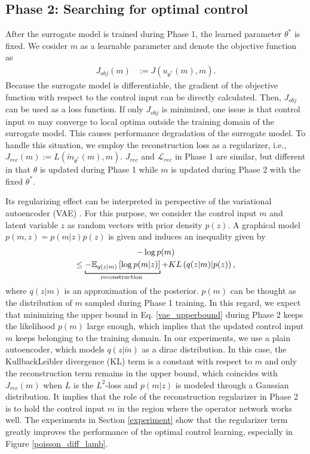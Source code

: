 \documentclass[letterpaper]{article}
\begin{document}
\subsection*{Phase 2: Searching for optimal control} \label{section3_2}
After the surrogate model is trained during Phase 1, the learned parameter $\theta^*$ is fixed. We cosider $m$ as a learnable parameter and denote the objective function as
\begin{align}
  J_{obj}(m) &:= J(u_{\theta^*}(m), m).
\end{align}
Because the surrogate model is differentiable, the gradient of the objective function with respect to the control input can be directly calculated. Then, $J_{obj}$ can be used as a loss function. If only $J_{obj}$ is minimized, one issue is that control input $m$ may converge to local optima outside the training domain of the surrogate model. This causes performance degradation of the surrogate model. To handle this situation, we employ the reconstruction loss as a regularizer, i.e., $J_{rec}(m) := L(\tilde{m}_{\theta^*} (m), m)$. $J_{rec}$ and $\mathcal{L}_{rec}$ in Phase 1 are similar, but different in that $\theta$ is updated during Phase 1 while $m$ is updated during Phase 2 with the fixed $\theta^*$.

Its regularizing effect can be interpreted in perspective of the variational autoencoder (VAE) \citep{kingma2013auto}. For this purpose, we consider the control input $m$ and latent variable $z$ as random vectors with prior density $p(z)$. A graphical model $p(m,z) = p(m|z)p(z)$ is given and induces an inequality given by
\begin{multline}\label{vae_upperbound}
  -\log p(m) \\
   \leq \underbracket[0.8pt]{-\mathbb{E}_{q(z|m)}\left[\log p(m| z) \right] }_\text{\clap{reconstruction~}} +KL\left(q(z|m) |p(z) \right),
\end{multline}
where $q(z|m)$ is an approximation of the posterior. $p(m)$ can be thought as the distribution of $m$ sampled during Phase 1 training. In this regard, we expect that minimizing the upper bound in Eq. \eqref{vae_upperbound} during Phase 2 keeps the likelihood $p(m)$ large enough, which implies that the updated control input $m$ keeps belonging to the training domain. In our experiments, we use a plain autoencoder, which models $q(z|\tilde{m})$ as a dirac distribution. In this case, the KullbackLeibler divergence (KL) term is a constant with respect to $m$ and only the reconstruction term remains in the upper bound, which coincides with $J_{rec}(m)$ when $L$ is the $L^2$-loss and $p(m|z)$ is modeled through a Gaussian distribution. It implies that the role of the reconstruction regularizer in Phase 2 is to hold the control input $m$ in the region where the operator network works well. The experiments in Section \ref{experiment} show that the regularizer term greatly improves the performance of the optimal control learning, especially in Figure \ref{poisson_diff_lamb}.
\end{document}
